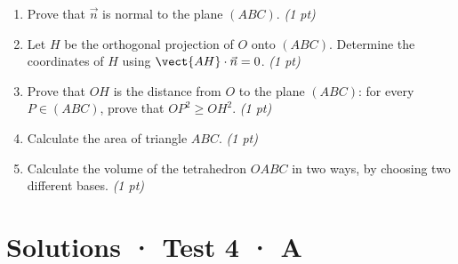 \begin{enumerate}

\item Prove that $\vec n$ is normal to the plane $(ABC)$. \hfill\textit{(1 pt)}

\item Let $H$ be the orthogonal projection of $O$ onto $(ABC)$. Determine the coordinates of $H$ using $\vect{AH}\cdot\vec n=0$. \hfill\textit{(1 pt)}

\item Prove that $OH$ is the distance from $O$ to the plane $(ABC)$: for every $P\in(ABC)$, prove that $OP^2\ge OH^2$. \hfill\textit{(1 pt)}

\item Calculate the area of triangle $ABC$. \hfill\textit{(1 pt)}

\item Calculate the volume of the tetrahedron $OABC$ in two ways, by choosing two different bases. \hfill\textit{(1 pt)}

\end{enumerate}

\ifmxteacher\mxnewpage

\section*{Solutions · Test 4 · A}\label{cor:6-3}

